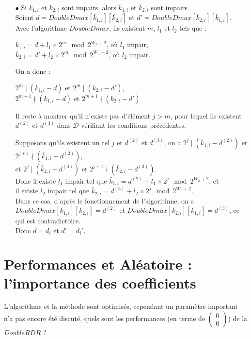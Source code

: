 \documentclass[12pt, a4paper]{memoir}
\newcommand{\doublezero}{\begin{pmatrix} 0 \\ 0 \end{pmatrix}}
\newcommand{\dbarre}{\overline{\mathcal{D}}}
\begin{document}
\begin{Preuve}
\begin{itemize}
   \item [$\bullet$] Si $k_{1,i}$ et $k_{2,i}$ sont impairs, alors $\bar{k}_{1,i}$ et $\bar{k}_{2,i}$ sont impairs. \\
   Soient $d = DoubleDmax[\bar{k}_{1,i}][\bar{k}_{2,i}]$ et $d' = DoubleDmax[\bar{k}_{2,i}][\bar{k}_{1,i}]$. \\
   Avec l'algorithme $DoubleDmax$, ils existent $m$, $l_1$ et $l_2$ tels que :
   \begin{center}
   $\bar{k}_{1,i} = d + l_1 \times 2^m \mod 2^{W_n+2}$, où $l_1$ impair, \\
   $\bar{k}_{2,i} = d' + l_2 \times 2^m \mod 2^{W_n+2}$, où $l_2$ impair.
   \end{center}
   On a donc :
   \begin{center}
   $2^{m} \mid (k_{1,i}-d)$ et $2^{m} \mid (k_{2,i}-d')$, \\
   $2^{m+1} \nmid (k_{1,i}-d)$ et $2^{m+1} \nmid (k_{2,i}-d')$
   \end{center}
   Il reste à montrer qu'il n'existe pas d'élément $j>m$, pour lequel ils existent $d^{(2)}$ et $d^{(3)}$ 
   dans $\dbarre$ vérifiant les conditions précédentes.   
   
   Supposons qu'ils existent un tel $j$ et $d^{(2)}$ et $d^{(3)}$, on a 
   $2^j \mid (\bar{k}_{1,i} - d^{(2)})$ et $2^{j+1} \nmid (\bar{k}_{1,i} - d^{(2)})$, \\
   et $2^j \mid (\bar{k}_{2,i} - d^{(3)})$ et $2^{j+1} \nmid (\bar{k}_{2,i} - d^{(3)})$. \\
   Donc il existe $l_1$ impair tel que $\bar{k}_{1,i} = d^{(2)} + l_1 \times 2^j \mod 2^{W_n+2}$, et \\
   il existe $l_2$ impair tel que $\bar{k}_{2,i} = d^{(3)} + l_2 \times 2^j \mod 2^{W_n+2}$. \\
   Dans ce cas, d'après le fonctionnement de l'algorithme, on a $DoubleDmax[\bar{k}_{1,i}][\bar{k}_{2,i}] = d^{(2)}$
   et $DoubleDmax[\bar{k}_{2,i}][\bar{k}_{1,i}] = d^{(3)}$, ce qui est contradictoire. \\
   Donc $d = d_i$ et $d' = d_i'$.   \end{itemize}
  \end{Preuve}
  
  \chapter{Performances et Aléatoire : l'importance des coefficients}
  
  L'algorithme et la méthode sont optimisés, cependant un paramètre important n'a pas encore été discuté,
  quels sont les performances (en terme de $\doublezero$) de la $DoubleRDR$ ?
  
\end{document}
